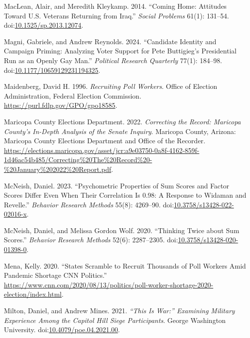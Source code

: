 \documentclass[
  12pt,
  letterpaper,
]{article}
\newlength{\cslhangindent}
\newenvironment{CSLReferences}[2] %
 {\begin{list}{}{%
  \setlength{\itemindent}{0pt}
  \setlength{\leftmargin}{0pt}
  \setlength{\parsep}{0pt}
  \ifodd #1
   \setlength{\leftmargin}{\cslhangindent}
   \setlength{\itemindent}{-1\cslhangindent}
  \fi
  \setlength{\itemsep}{#2\baselineskip}}}
 {\end{list}}
\begin{document}
\begin{CSLReferences}{1}{1}
MacLean, Alair, and Meredith Kleykamp. 2014. {``Coming {Home}:
{Attitudes} Toward {U}.{S}. {Veterans Returning} from {Iraq}.''}
\emph{Social Problems} 61(1): 131--54.
doi:\href{https://doi.org/10.1525/sp.2013.12074}{10.1525/sp.2013.12074}.

Magni, Gabriele, and Andrew Reynolds. 2024. {``Candidate {Identity} and
{Campaign Priming}: {Analyzing Voter Support} for {Pete Buttigieg}'s
{Presidential Run} as an {Openly Gay Man}.''} \emph{Political Research
Quarterly} 77(1): 184--98.
doi:\href{https://doi.org/10.1177/10659129231194325}{10.1177/10659129231194325}.

Maidenberg, David H. 1996. \emph{Recruiting {Poll Workers}}. Office of
Election Administration, Federal Election Commission.
\url{https://purl.fdlp.gov/GPO/gpo18585}.

Maricopa County Elections Department. 2022. \emph{Correcting the
{Record}: {Maricopa County}'s {In-Depth Analysis} of the {Senate
Inquiry}}. Maricopa County, Arizona: {Maricopa County Elections
Department and Office of the Recorder}.
\url{https://elections.maricopa.gov/asset/jcr:a9e03750-0a8f-4162-859f-1d46ac54b485/Correcting\%20The\%20Record\%20-\%20January\%202022\%20Report.pdf}.

McNeish, Daniel. 2023. {``Psychometric Properties of Sum Scores and
Factor Scores Differ Even When Their Correlation Is 0.98: {A} Response
to {Widaman} and {Revelle}.''} \emph{Behavior Research Methods} 55(8):
4269--90.
doi:\href{https://doi.org/10.3758/s13428-022-02016-x}{10.3758/s13428-022-02016-x}.

McNeish, Daniel, and Melissa Gordon Wolf. 2020. {``Thinking Twice about
Sum Scores.''} \emph{Behavior Research Methods} 52(6): 2287--2305.
doi:\href{https://doi.org/10.3758/s13428-020-01398-0}{10.3758/s13428-020-01398-0}.

Mena, Kelly. 2020. {``States Scramble to Recruit Thousands of Poll
Workers Amid Pandemic Shortage \textbar{} {CNN Politics}.''}
\url{https://www.cnn.com/2020/08/13/politics/poll-worker-shortage-2020-election/index.html}.

Milton, Daniel, and Andrew Mines. 2021. \emph{{``{This} Is {War}:''}
{Examining Military Experience Among} the {Capitol Hill Siege
Participants}}. George Washington University.
doi:\href{https://doi.org/10.4079/poe.04.2021.00}{10.4079/poe.04.2021.00}.


\end{CSLReferences}
\end{document}
